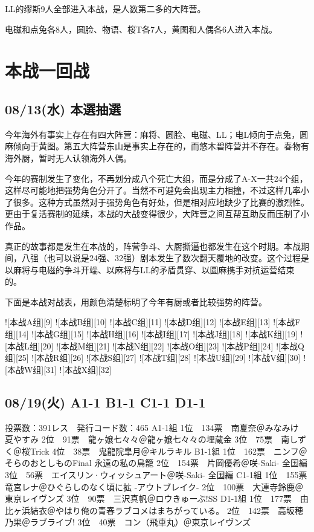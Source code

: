 LL的缪斯9人全部进入本战，是人数第二多的大阵营。

电磁和点兔各8人，圆脸、物语、桜T各7人，黄图和人偶各6人进入本战。

\section{本战一回战}

\subsection{08/13(水) 本選抽選}

今年海外有事实上存在有四大阵营：麻将、圆脸、电磁、LL；电L倾向于点兔，圆麻倾向于黄图。第五大阵营东山是事实上存在的，而悠木碧阵营并不存在。春物有海外厨，暂时无人认领海外人偶。

今年的赛制发生了变化，不再划分成八个死亡大组，而是分成了A-X一共24个组，这样尽可能地把强势角色分开了。当然不可避免会出现主力相撞，不过这样几率小了很多。这种方式虽然对于强势角色有好处，但是相对应地缺少了比赛的激烈性。更由于复活赛制的延续，本战的大战变得很少，大阵营之间互帮互助反而压制了小作品。

真正的故事都是发生在本战的，阵营争斗、大厨撕逼也都发生在这个时期。本战期间，八强（也可以说是24强、32强）剧本发生了数次翻天覆地的改变。这个过程是以麻将与电磁的争斗开端、以麻将与LL的矛盾贯穿、以圆麻携手对抗运营结束的。

下面是本战对战表，用颜色清楚标明了今年有厨或者比较强势的阵营。

![本战A组][9]
![本战B组][10]
![本战C组][11]
![本战D组][12]
![本战E组][13]
![本战F组][14]
![本战G组][15]
![本战H组][16]
![本战I组][17]
![本战J组][18]
![本战K组][19]
![本战L组][20]
![本战M组][21]
![本战N组][22]
![本战O组][23]
![本战P组][24]
![本战Q组][25]
![本战R组][26]
![本战S组][27]
![本战T组][28]
![本战U组][29]
![本战V组][30]
![本战W组][31]
![本战X组][32]

\subsection{08/19(火) A1-1 B1-1 C1-1 D1-1}

    投票数：391レス　発行コード数：465
    A1-1組
    1位　134票　南夏奈＠みなみけ 夏やすみ
    2位　91票　龍ヶ嬢七々々＠龍ヶ嬢七々々の埋蔵金
    3位　75票　南しずく＠桜Trick
    4位　38票　鬼龍院皐月＠キルラキル
    B1-1組
    1位　162票　ニンフ＠そらのおとしものFinal 永遠の私の鳥籠
    2位　154票　片岡優希＠咲-Saki- 全国編
    3位　56票　エイスリン·ウィッシュアート＠咲-Saki- 全国編
    C1-1組
    1位　155票　竜宮レナ＠ひぐらしのなく頃に拡 -アウトブレイク-
    2位　100票　大連寺鈴鹿＠東京レイヴンズ
    3位　90票　三沢真帆＠ロウきゅーぶ!SS
    D1-1組
    1位　177票　由比ヶ浜結衣＠やはり俺の青春ラブコメはまちがっている。
    2位　142票　高坂穂乃果＠ラブライブ!
    3位　40票　コン（飛車丸）＠東京レイヴンズ

